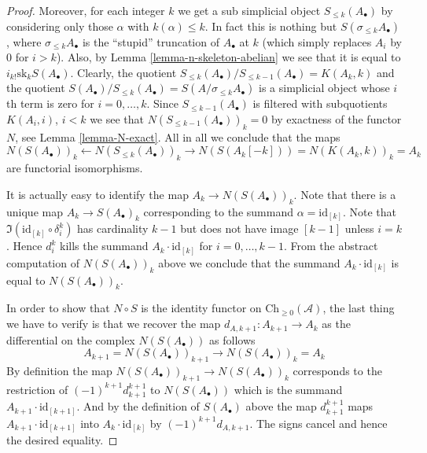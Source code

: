 \begin{proof}
\medskip\noindent
Moreover, for each integer $k$ we get a sub simplicial
object $S_{\leq k}(A_\bullet)$ by considering
only those $\alpha$ with $k(\alpha) \leq k$.
In fact this is nothing but $S(\sigma_{\leq k}A_\bullet)$,
where $\sigma_{\leq k}A_\bullet$ is the ``stupid'' truncation
of $A_\bullet$ at $k$ (which simply replaces $A_i$ by
$0$ for $i > k$). Also, by Lemma \ref{lemma-n-skeleton-abelian}
we see that it is equal to $i_{k!}\text{sk}_k S(A_\bullet)$.
Clearly, the quotient
$S_{\leq k}(A_\bullet)/S_{\leq k - 1}(A_\bullet) = K(A_k, k)$
and the quotient
$S(A_\bullet)/S_{\leq k}(A_\bullet) = S(A/\sigma_{\leq k}A_\bullet)$
is a simplicial object whose $i$th term is zero for $i = 0, \ldots, k$.
Since $S_{\leq k - 1}(A_\bullet)$ is filtered with
subquotients $K(A_i, i)$, $i < k$ we see that
$N(S_{\leq k - 1}(A_\bullet))_k = 0$ by exactness
of the functor $N$, see Lemma \ref{lemma-N-exact}.
All in all we conclude that the maps
$$
N(S(A_\bullet))_k
\leftarrow
N(S_{\leq k}(A_\bullet))_k
\to
N(S(A_k[-k])) = N(K(A_k, k))_k = A_k
$$
are functorial isomorphisms.

\medskip\noindent
It is actually easy to identify the map $A_k \to N(S(A_\bullet))_k$.
Note that there is a unique map $A_k \to S(A_\bullet)_k$
corresponding to the summand $\alpha = \text{id}_{[k]}$.
Note that $\Im(\text{id}_{[k]} \circ \delta^k_i)$
has cardinality $k - 1$ but does not
have image $[k - 1]$ unless $i = k$. Hence
$d^k_i$ kills the summand $A_k \cdot \text{id}_{[k]}$
for $i = 0, \ldots, k - 1$. From the abstract computation
of $N(S(A_\bullet))_k$ above we conclude that
the summand $A_k \cdot \text{id}_{[k]}$ is equal to
$N(S(A_\bullet))_k$.

\medskip\noindent
In order to show that $N \circ S$ is the identity
functor on $\text{Ch}_{\geq 0}(\mathcal{A})$,
the last thing we have to verify
is that we recover the map $d_{A, k + 1} : A_{k + 1} \to A_k$
as the differential on the complex $N(S(A_\bullet))$
as follows
$$
A_{k + 1} = N(S(A_\bullet))_{k + 1} \to N(S(A_\bullet))_k = A_k
$$
By definition the map
$N(S(A_\bullet))_{k + 1} \to N(S(A_\bullet))_k$
corresponds to the restriction of $(-1)^{k + 1}d^{k + 1}_{k + 1}$
to $N(S(A_\bullet))$ which is
the summand $A_{k + 1} \cdot \text{id}_{[k + 1]}$.
And by the definition of $S(A_\bullet)$ above the
map $d^{k + 1}_{k + 1}$ maps $A_{k + 1} \cdot \text{id}_{[k + 1]}$
into $A_k \cdot \text{id}_{[k]}$ by $(-1)^{k + 1}d_{A, k + 1}$.
The signs cancel and hence the desired equality.


\end{proof}
